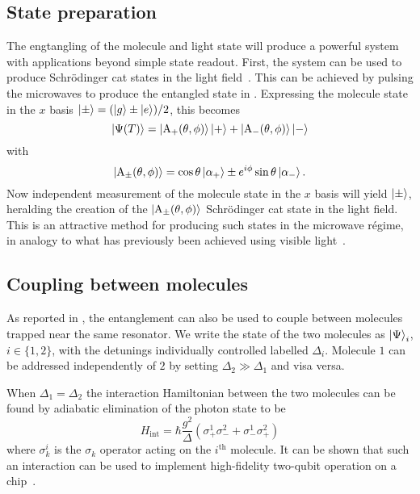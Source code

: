 \subsection{State preparation}

The engtangling of the molecule and light state will produce a powerful system
with applications beyond simple state readout. First, the system can be used to
produce Schr\"odinger cat states in the light field~\cite{Andre2006}. This can be achieved
by pulsing the microwaves to produce the entangled state in
. Expressing the molecule state in the $x$ basis
$\ket{\pm} = (\ket{g} \pm \ket{e})/2$, this becomes
%
\begin{equation}
  \ket{\Psi(T)} = \ket{\mathrm{A}_+(\theta, \phi) }\ket{+} + \ket{\mathrm{A}_-(\theta,
  \phi)}\ket{-}
\end{equation}
%
with
%
\begin{equation}
  \ket{\mathrm{A}_\pm(\theta, \phi)} = \cos\theta\ket{\alpha_+} \pm
  e^{i\phi}\sin\theta\ket{\alpha_-}.
\end{equation}
%
Now independent measurement of the molecule state in the $x$ basis will yield
$\ket{\pm}$, heralding the creation of the $\ket{\mathrm{A}_\pm(\theta, \phi)}$
Schr\"odinger cat state in the light field. This is an attractive method for
producing such states in the microwave r\'egime, in analogy to what has
previously been achieved using visible light~\cite{Hacker2019}.

\subsection{Coupling between molecules}

As reported in , the entanglement can also be used to
couple between molecules trapped near the same resonator. We write the state of
the two molecules as $\ket{\Psi}_i$, $i\in\{1,2\}$, with the detunings
individually controlled labelled $\Delta_i$. Molecule $1$ can be addressed
independently of $2$ by setting $\Delta_2 \gg \Delta_1$ and visa versa. 

When $\Delta_1 = \Delta_2$ the interaction Hamiltonian between the two
molecules can be found by adiabatic elimination of the photon state to
be~\cite{Andre2006}
%
\begin{equation}
  H_\text{int} = \hbar \frac{g^2}{\Delta} (\sigma_+^1\sigma_-^2 +
  \sigma_-^1\sigma_+^2)
\end{equation}
%
where $\sigma^i_k$ is the $\sigma_k$ operator acting on the
$i^\text{th}$ molecule. It can be shown that such an interaction can be used to
implement high-fidelity two-qubit operation on a chip~\cite{Andre2006,
PhysRevA.69.062320}.
